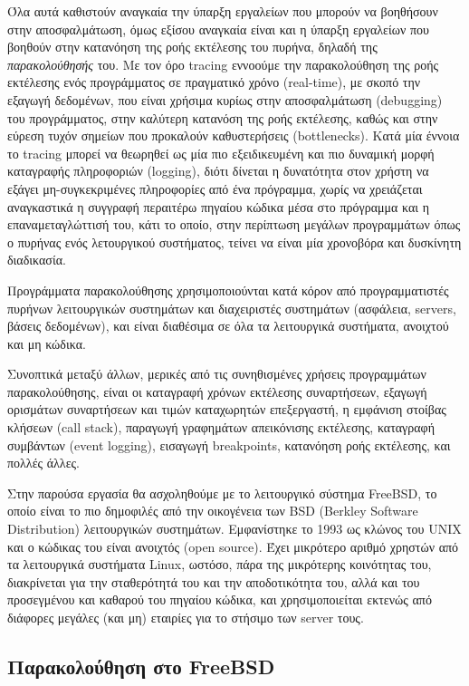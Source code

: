 \documentclass[12pt]{article}
\begin{document}
Όλα αυτά καθιστούν αναγκαία την ύπαρξη εργαλείων που μπορούν να βοηθήσουν στην
αποσφαλμάτωση, όμως εξίσου αναγκαία είναι και η ύπαρξη εργαλείων που βοηθούν
στην κατανόηση της ροής εκτέλεσης του πυρήνα, δηλαδή της
\textit{παρακολούθησής} του. Με τον όρο tracing εννοούμε την παρακολούθηση της
ροής εκτέλεσης ενός προγράμματος σε πραγματικό χρόνο (real-time), με σκοπό την
εξαγωγή δεδομένων, που είναι χρήσιμα κυρίως στην αποσφαλμάτωση (debugging) του
προγράμματος, στην καλύτερη κατανόση της ροής εκτέλεσης, καθώς και στην εύρεση
τυχόν σημείων που προκαλούν καθυστερήσεις (bottlenecks). Κατά μία έννοια το
tracing μπορεί να θεωρηθεί ως μία πιο εξειδικευμένη και πιο δυναμική μορφή
καταγραφής πληροφοριών (logging), διότι δίνεται η δυνατότητα στον χρήστη να
εξάγει μη-συγκεκριμένες πληροφορίες από ένα πρόγραμμα, χωρίς να χρειάζεται
αναγκαστικά η συγγραφή περαιτέρω πηγαίου κώδικα μέσα στο πρόγραμμα και η
επαναμεταγλώττισή του, κάτι το οποίο, στην περίπτωση μεγάλων προγραμμάτων όπως
ο πυρήνας ενός λετουργικού συστήματος, τείνει να είναι μία χρονοβόρα και
δυσκίνητη διαδικασία.

Προγράμματα παρακολούθησης χρησιμοποιούνται κατά κόρον από προγραμματιστές
πυρήνων λειτουργικών συστημάτων και διαχειριστές συστημάτων (ασφάλεια, servers,
βάσεις δεδομένων), και είναι διαθέσιμα σε όλα τα λειτουργικά συστήματα,
ανοιχτού και μη κώδικα.

Συνοπτικά μεταξύ άλλων, μερικές από τις συνηθισμένες χρήσεις προγραμμάτων
παρακολούθησης, είναι οι καταγραφή χρόνων εκτέλεσης συναρτήσεων, εξαγωγή
ορισμάτων συναρτήσεων και τιμών καταχωρητών επεξεργαστή, η εμφάνιση στοίβας
κλήσεων (call stack), παραγωγή γραφημάτων απεικόνισης εκτέλεσης, καταγραφή
συμβάντων (event logging), εισαγωγή breakpoints, κατανόηση ροής εκτέλεσης, και
πολλές άλλες.

Στην παρούσα εργασία θα ασχοληθούμε με το λειτουργικό σύστημα FreeBSD, το οποίο
είναι το πιο δημοφιλές από την οικογένεια των BSD (Berkley Software
Distribution) λειτουργικών συστημάτων. Εμφανίστηκε το 1993 ως κλώνος του UNIX
και ο κώδικας του είναι ανοιχτός (open source). Έχει μικρότερο αριθμό χρηστών
από τα λειτουργικά συστήματα Linux, ωστόσο, πάρα της μικρότερης κοινότητας του,
διακρίνεται για την σταθερότητά του και την αποδοτικότητα του, αλλά και του
προσεγμένου και καθαρού του πηγαίου κώδικα, και χρησιμοποιείται εκτενώς από
διάφορες μεγάλες (και μη) εταιρίες για το στήσιμο των server τους.

\subsection{Παρακολούθηση στο FreeBSD}
\end{document}
